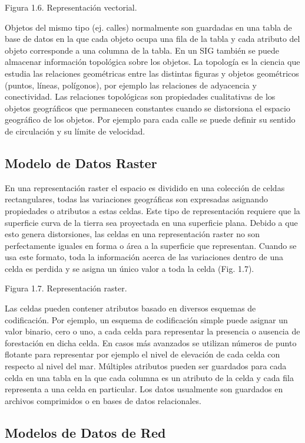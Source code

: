 Figura 1.6. Representación vectorial.

Objetos del mismo tipo (ej. calles) normalmente son guardadas en una tabla de base de datos en la que cada objeto ocupa una fila de la tabla y cada atributo del objeto corresponde a una columna de la tabla. En un SIG también se puede almacenar información topológica sobre los objetos. La topología es la ciencia que estudia las relaciones geométricas entre las distintas figuras y objetos geométricos (puntos, líneas, polígonos), por ejemplo las relaciones de adyacencia y conectividad. Las relaciones topológicas son propiedades cualitativas de los objetos geográficos que permanecen constantes cuando se distorsiona el espacio geográfico de los objetos.  Por ejemplo para cada calle se puede definir su sentido de circulación y su límite de velocidad.

\subsection{Modelo de Datos Raster}

En una representación raster el espacio es dividido en una colección de celdas rectangulares, todas las variaciones geográficas son expresadas asignando propiedades o atributos a estas celdas. Este tipo de representación requiere que la superficie curva de la tierra sea proyectada en una superficie plana. Debido a que esto genera distorsiones, las celdas en una representación raster no son perfectamente iguales en forma o área a la superficie que representan. Cuando se usa este formato, toda la información acerca de las variaciones dentro de una celda es perdida y se asigna un único valor a toda la celda (Fig. 1.7).

Figura 1.7. Representación raster.

Las celdas pueden contener atributos basado en diversos esquemas de codificación. Por ejemplo, un esquema de codificación simple puede asignar un valor binario, cero o uno, a cada celda para representar la presencia o ausencia de forestación en dicha celda. En casos más avanzados se utilizan números de punto flotante para representar por ejemplo el nivel de elevación de cada celda con respecto al nivel del mar. Múltiples atributos pueden ser guardados para cada celda en una tabla en la que cada columna es un atributo de la celda y cada fila representa a una celda en particular. Los datos usualmente son guardados en archivos comprimidos o en bases de datos relacionales.

\subsection{Modelos de Datos de Red}

